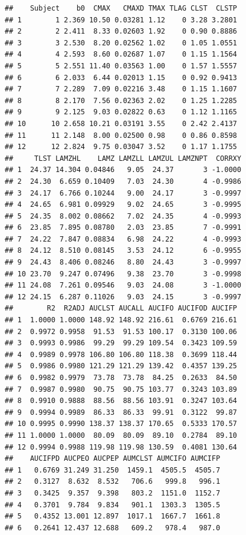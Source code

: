 \documentclass[
  11pt,
  krantz2, a4paper, twoside]{krantz}
\theoremstyle{definition}
\theoremstyle{definition}
\theoremstyle{definition}
\theoremstyle{definition}
\theoremstyle{remark}
\begin{document}
\begin{verbatim}
##    Subject    b0  CMAX   CMAXD TMAX TLAG CLST  CLSTP
## 1        1 2.369 10.50 0.03281 1.12    0 3.28 3.2801
## 2        2 2.411  8.33 0.02603 1.92    0 0.90 0.8886
## 3        3 2.530  8.20 0.02562 1.02    0 1.05 1.0551
## 4        4 2.593  8.60 0.02687 1.07    0 1.15 1.1564
## 5        5 2.551 11.40 0.03563 1.00    0 1.57 1.5557
## 6        6 2.033  6.44 0.02013 1.15    0 0.92 0.9413
## 7        7 2.289  7.09 0.02216 3.48    0 1.15 1.1607
## 8        8 2.170  7.56 0.02363 2.02    0 1.25 1.2285
## 9        9 2.125  9.03 0.02822 0.63    0 1.12 1.1165
## 10      10 2.658 10.21 0.03191 3.55    0 2.42 2.4137
## 11      11 2.148  8.00 0.02500 0.98    0 0.86 0.8598
## 12      12 2.824  9.75 0.03047 3.52    0 1.17 1.1755
##     TLST LAMZHL    LAMZ LAMZLL LAMZUL LAMZNPT  CORRXY
## 1  24.37 14.304 0.04846   9.05  24.37       3 -1.0000
## 2  24.30  6.659 0.10409   7.03  24.30       4 -0.9986
## 3  24.17  6.766 0.10244   9.00  24.17       3 -0.9997
## 4  24.65  6.981 0.09929   9.02  24.65       3 -0.9995
## 5  24.35  8.002 0.08662   7.02  24.35       4 -0.9993
## 6  23.85  7.895 0.08780   2.03  23.85       7 -0.9991
## 7  24.22  7.847 0.08834   6.98  24.22       4 -0.9993
## 8  24.12  8.510 0.08145   3.53  24.12       6 -0.9955
## 9  24.43  8.406 0.08246   8.80  24.43       3 -0.9997
## 10 23.70  9.247 0.07496   9.38  23.70       3 -0.9998
## 11 24.08  7.261 0.09546   9.03  24.08       3 -1.0000
## 12 24.15  6.287 0.11026   9.03  24.15       3 -0.9997
##        R2  R2ADJ AUCLST AUCALL AUCIFO AUCIFOD AUCIFP
## 1  1.0000 1.0000 148.92 148.92 216.61  0.6769 216.61
## 2  0.9972 0.9958  91.53  91.53 100.17  0.3130 100.06
## 3  0.9993 0.9986  99.29  99.29 109.54  0.3423 109.59
## 4  0.9989 0.9978 106.80 106.80 118.38  0.3699 118.44
## 5  0.9986 0.9980 121.29 121.29 139.42  0.4357 139.25
## 6  0.9982 0.9979  73.78  73.78  84.25  0.2633  84.50
## 7  0.9987 0.9980  90.75  90.75 103.77  0.3243 103.89
## 8  0.9910 0.9888  88.56  88.56 103.91  0.3247 103.64
## 9  0.9994 0.9989  86.33  86.33  99.91  0.3122  99.87
## 10 0.9995 0.9990 138.37 138.37 170.65  0.5333 170.57
## 11 1.0000 1.0000  80.09  80.09  89.10  0.2784  89.10
## 12 0.9994 0.9988 119.98 119.98 130.59  0.4081 130.64
##    AUCIFPD AUCPEO AUCPEP AUMCLST AUMCIFO AUMCIFP
## 1   0.6769 31.249 31.250  1459.1  4505.5  4505.7
## 2   0.3127  8.632  8.532   706.6   999.8   996.1
## 3   0.3425  9.357  9.398   803.2  1151.0  1152.7
## 4   0.3701  9.784  9.834   901.1  1303.3  1305.5
## 5   0.4352 13.001 12.897  1017.1  1667.7  1661.8
## 6   0.2641 12.437 12.688   609.2   978.4   987.0

\end{verbatim}
\end{document}
